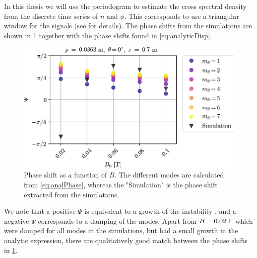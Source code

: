 In this thesis we will use the periodogram to estimate the cross spectral density from the discrete time series of $n$ and $\phi$.
This corresponds to use a triangular window for the signals (see \cite{Miller2004book} for details).
The phase shifts from the simulations are shown in \cref{fig:phaseShift} together with the phase shifts found in \cref{eq:analyticDisp}.
%
\begin{figure}
    \includegraphics{fig/results/growthRates/phaseShift}
    \caption{
        Phase shift as a function of $B$.
        The different modes are calculated from \cref{eq:analPhase}, whereas the "Simulation" is the phase shift extracted from the simulations.
    }
    \label{fig:phaseShift}
\end{figure}
%
We note that a positive $\Psi$ is equivalent to a growth of the instability \cite{Garcia2001a}, and a negative $\Psi$ corresponds to a damping of the modes.
Apart from $B=0.02\, \text{T}$ which were damped for all modes in the simulations, but had a small growth in the analytic expression, there are qualitatively good match between the phase shifts in \cref{fig:phaseShift}.

